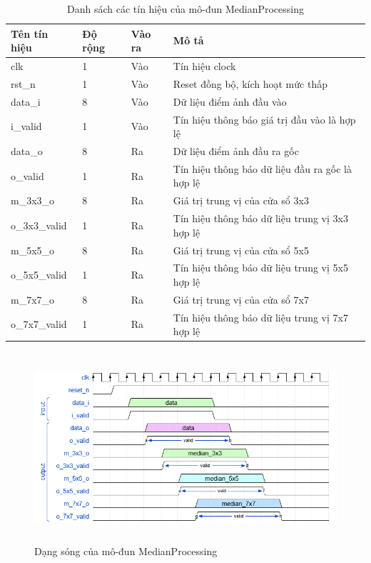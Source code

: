 \begin{table}[!ht]
    \centering
    \renewcommand{\arraystretch}{1.3} %
        \caption{Danh sách các tín hiệu của mô-đun MedianProcessing}
    \begin{tabular}{|p{3cm} p{2cm} p{2cm} p{8cm}|}
        \hline
        \rowcolor{gray!30}
        \textbf{Tên tín hiệu} & \textbf{Độ rộng} & \textbf{Vào ra} & \textbf{Mô tả} \\
        \hline
        clk & 1 & Vào & Tín hiệu clock \\
        \hline
        rst\_n & 1 & Vào & Reset đồng bộ, kích hoạt mức thấp \\
        \hline 
        data\_i & 8 & Vào & Dữ liệu điểm ảnh đầu vào
        \\ \hline
        i\_valid & 1 & Vào & Tín hiệu thông báo giá trị đầu vào là hợp lệ
        \\ \hline
        data\_o & 8 & Ra & Dữ liệu điểm ảnh đầu ra gốc
        \\ \hline
        o\_valid & 1 & Ra & Tín hiệu thông báo dữ liệu đầu ra gốc là hợp lệ
        \\ \hline
        m\_3x3\_o & 8 & Ra & Giá trị trung vị của cửa sổ 3x3
        \\ \hline
        o\_3x3\_valid & 1 & Ra & Tín hiệu thông báo dữ liệu trung vị 3x3 hợp lệ
                \\ \hline
        m\_5x5\_o & 8 & Ra & Giá trị trung vị của cửa sổ 5x5
        \\ \hline
        o\_5x5\_valid & 1 & Ra & Tín hiệu thông báo dữ liệu trung vị 5x5 hợp lệ
                \\ \hline
        m\_7x7\_o & 8 & Ra & Giá trị trung vị của cửa sổ 7x7
        \\ \hline
        o\_7x7\_valid & 1 & Ra & Tín hiệu thông báo dữ liệu trung vị 7x7 hợp lệ
        \\ \hline
       
    \end{tabular}

    \label{tab:signalListMedianProcessing}
\end{table}

\begin{figure}[!ht]
    \centering
    \includegraphics[width=1\linewidth, height =7cm]{figures/medianProcessing.png}
    \caption{Dạng sóng của mô-đun MedianProcessing}
    \label{fig:medianProcessing}
\end{figure}
